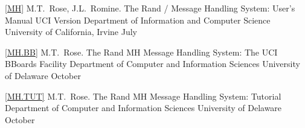\let\journalinfo=\jourinfo
\let\thesis=\book			%
\let\thesisinfo=\bookinfo		%


\ref{MH}
\by M.T.~Rose, J.L.~Romine.
\paper The Rand \MH/ Message Handling System: User's Manual
\paperinfo UCI Version
\other
\publ Department of Information and Computer Science
\publaddr University of California, Irvine
\month July
\endref

\ref{MH.BB}
\by M.T.~Rose.
\paper The Rand MH Message Handling System: The UCI BBoards Facility
\other
\publ Department of Computer and Information Sciences
\publaddr University of Delaware
\month October
\endref

\ref{MH.TUT}
\by M.T.~Rose.
\paper The Rand MH Message Handling System: Tutorial
\other
\publ Department of Computer and Information Sciences
\publaddr University of Delaware
\month October
\endref

\endreferences
